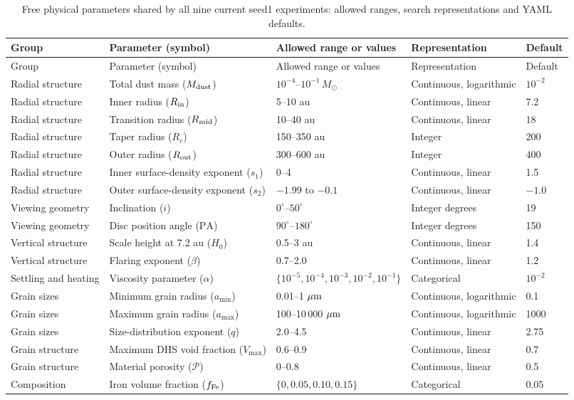 \documentclass[11pt,a4paper]{article}
\newcommand{\Msun}{M_\odot}
\begin{document}
\begingroup
\small
\setlength{\tabcolsep}{3pt}
\begin{longtable}{@{}P{2.0cm}P{4.8cm}P{4.1cm}P{3.0cm}P{1.8cm}@{}}
\caption{Free physical parameters shared by all nine current seed1 experiments: allowed ranges, search representations and YAML defaults.}
\label{tab:free}\\
\toprule
Group & Parameter (symbol) & Allowed range or values & Representation & Default \\
\midrule
\endfirsthead
\toprule
Group & Parameter (symbol) & Allowed range or values & Representation & Default \\
\midrule
\endhead
\bottomrule
\endfoot
Radial structure & Total dust mass ($M_{\rm dust}$) & $10^{-4}$--$10^{-1}\,\Msun$ & Continuous, logarithmic & $10^{-2}$ \\
Radial structure & Inner radius ($R_{\rm in}$) & 5--10 au & Continuous, linear & 7.2 \\
Radial structure & Transition radius ($R_{\rm mid}$) & 10--40 au & Continuous, linear & 18 \\
Radial structure & Taper radius ($R_c$) & 150--350 au & Integer & 200 \\
Radial structure & Outer radius ($R_{\rm out}$) & 300--600 au & Integer & 400 \\
Radial structure & Inner surface-density exponent ($s_1$) & 0--4 & Continuous, linear & 1.5 \\
Radial structure & Outer surface-density exponent ($s_2$) & $-1.99$ to $-0.1$ & Continuous, linear & $-1.0$ \\
\midrule
Viewing geometry & Inclination ($i$) & $0^\circ$--$50^\circ$ & Integer degrees & 19 \\
Viewing geometry & Disc position angle ($\mathrm{PA}$) & $90^\circ$--$180^\circ$ & Integer degrees & 150 \\
\midrule
Vertical structure & Scale height at 7.2 au ($H_0$) & 0.5--3 au & Continuous, linear & 1.4 \\
Vertical structure & Flaring exponent ($\beta$) & 0.7--2.0 & Continuous, linear & 1.2 \\
Settling and heating & Viscosity parameter ($\alpha$) & $\{10^{-5},\allowbreak 10^{-4},\allowbreak 10^{-3},\allowbreak 10^{-2},\allowbreak 10^{-1}\}$ & Categorical & $10^{-2}$ \\
\midrule
Grain sizes & Minimum grain radius ($a_{\min}$) & 0.01--1 $\mu{\rm m}$ & Continuous, logarithmic & 0.1 \\
Grain sizes & Maximum grain radius ($a_{\max}$) & 100--10\,000 $\mu{\rm m}$ & Continuous, logarithmic & 1000 \\
Grain sizes & Size-distribution exponent ($q$) & 2.0--4.5 & Continuous, linear & 2.75 \\
Grain structure & Maximum DHS void fraction ($V_{\max}$) & 0.6--0.9 & Continuous, linear & 0.7 \\
Grain structure & Material porosity ($\mathcal P$) & 0--0.8 & Continuous, linear & 0.5 \\
Composition & Iron volume fraction ($f_{\rm Fe}$) & $\{0,0.05,0.10,0.15\}$ & Categorical & 0.05 \\
\end{longtable}
\endgroup
\end{document}
